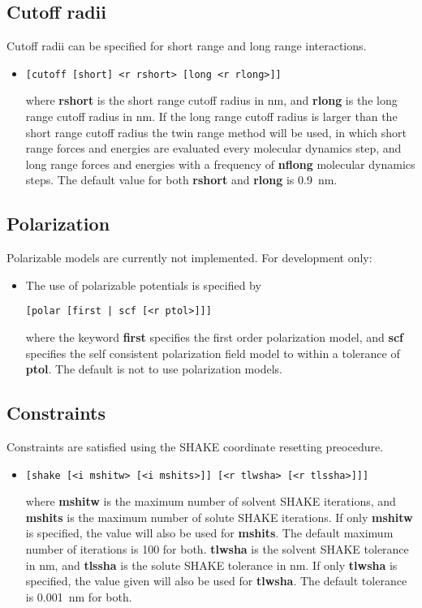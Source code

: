 \subsection{Cutoff radii}
Cutoff radii can be specified for short range and long range interactions.
\begin{itemize}
\item
\begin{verbatim}
[cutoff [short] <r rshort> [long <r rlong>]]
\end{verbatim}
where {\bf rshort} is the short range cutoff radius in nm, and {\bf rlong}
is the long range cutoff radius in nm. If the long range cutoff radius
is larger than the short range cutoff radius the twin range method will
be used, in which short range forces and energies are evaluated every
molecular dynamics step, and long range forces and energies with a
frequency of {\bf nflong} molecular dynamics steps. The default value
for both {\bf rshort} and {\bf rlong} is 0.9~nm.
\end{itemize}
\subsection{Polarization}
Polarizable models are currently not implemented. For development only:
\begin{itemize}
\item
The use of polarizable potentials is specified by
\begin{verbatim}
[polar [first | scf [<r ptol>]]]
\end{verbatim}
where the keyword {\bf first} specifies the first order polarization
model, and {\bf scf} specifies the self consistent polarization field
model to within a tolerance of {\bf ptol}. The default is not to
use polarization models.
\end{itemize}
\subsection{Constraints}
Constraints are satisfied using the SHAKE coordinate resetting preocedure.
\begin{itemize}
\item
\begin{verbatim}
[shake [<i mshitw> [<i mshits>]] [<r tlwsha> [<r tlssha>]]]
\end{verbatim}
where {\bf mshitw} is the maximum number of solvent SHAKE iterations,
and {\bf mshits} is the maximum number of solute SHAKE iterations. If
only {\bf mshitw} is specified, the value will also be used for {\bf mshits}.
The default maximum number of iterations is 100 for both.
{\bf tlwsha} is the solvent SHAKE tolerance in nm, and {\bf tlssha} is
the solute SHAKE tolerance in nm. If only {\bf tlwsha} is specified, the
value given will also be used for {\bf tlwsha}. The default tolerance
is 0.001~nm for both.
\end{itemize}
